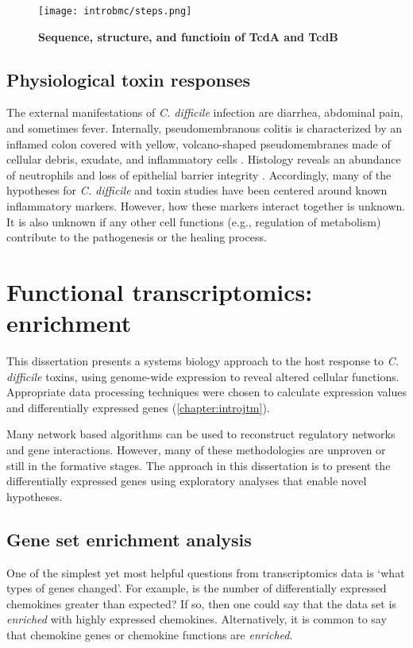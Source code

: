 \begin{figure}[h!]
  \centering
  \texttt{[image: introbmc/steps.png]}
  \caption{\textbf{Sequence, structure, and functioin of TcdA and TcdB}}
  \label{introbmc:steps}
\end{figure}

\subsection{Physiological toxin responses}
The external manifestations of \textit{C. difficile} infection 
are diarrhea, abdominal pain, and sometimes fever.
Internally, pseudomembranous colitis is characterized by
an inflamed colon covered with yellow, volcano-shaped 
pseudomembranes made of cellular debris, exudate,
and inflammatory cells \cite{Tedesco:1974jo}. 
Histology reveals an abundance of neutrophils and
loss of epithelial barrier integrity \cite{Lyerly:1988dk,Kelly:1994cu}.
Accordingly, many of the hypotheses for \textit{C. difficile}
and toxin studies have been centered around known inflammatory
markers. However, how these markers interact together
is unknown. It is also unknown if any other cell functions
(e.g., regulation of metabolism) contribute to the pathogenesis
or the healing process.


\section{Functional transcriptomics: enrichment}
This dissertation presents a systems biology approach
to the host response to \textit{C. difficile} toxins,
using genome-wide expression to reveal altered cellular functions.
Appropriate data processing techniques were chosen to calculate
expression values and differentially expressed genes (\autoref{chapter:introjtm}).

Many network based algorithms can be used to reconstruct regulatory networks
and gene interactions. However, many of these methodologies are unproven
or still in the formative stages. The approach in this dissertation
is to present the differentially expressed genes using exploratory analyses
that enable novel hypotheses.

\subsection{Gene set enrichment analysis}
One of the simplest yet most helpful questions from transcriptomics data is `what
types of genes changed'. For example, is the number of differentially expressed chemokines 
greater than expected? If so, then one could say that the data
set is \textit{enriched} with highly expressed chemokines. Alternatively,
it is common to say that chemokine genes or chemokine functions
are \textit{enriched}.

